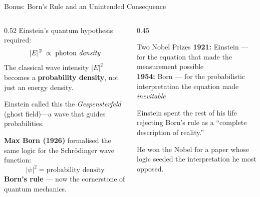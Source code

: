 \documentclass[aspectratio=169,12pt]{beamer}
\begin{document}
\begin{frame}[shrink=5]{Bonus: Born's Rule and an Unintended Consequence}

\begin{columns}[T]
\begin{column}{0.52\textwidth}
Einstein's quantum hypothesis required:
\[
  |E|^2 \;\propto\; \text{photon \emph{density}}
\]
The classical wave intensity $|E|^2$ becomes a
\textbf{probability density}, not just an energy density.

\medskip
Einstein called this the \emph{Gespensterfeld}
(ghost field)---a wave that guides probabilities.

\bigskip
\textbf{Max Born (1926)} formalised the same logic
for the Schr\"odinger wave function:
\[
  \boxed{|\psi|^2 = \text{probability density}}
\]
\textbf{Born's rule} --- now the cornerstone of quantum mechanics.
\end{column}
\begin{column}{0.45\textwidth}
\begin{alertblock}{Two Nobel Prizes}
\textbf{1921:} Einstein --- for the equation
that made the measurement possible
\\[4pt]
\textbf{1954:} Born --- for the probabilistic
interpretation the equation made
\emph{inevitable}
\end{alertblock}

\bigskip
Einstein spent the rest of his life
rejecting Born's rule as a ``complete
description of reality.''

\bigskip
He won the Nobel for a paper whose
logic seeded the interpretation he
most opposed.
\end{column}
\end{columns}

\end{frame}
\end{document}
